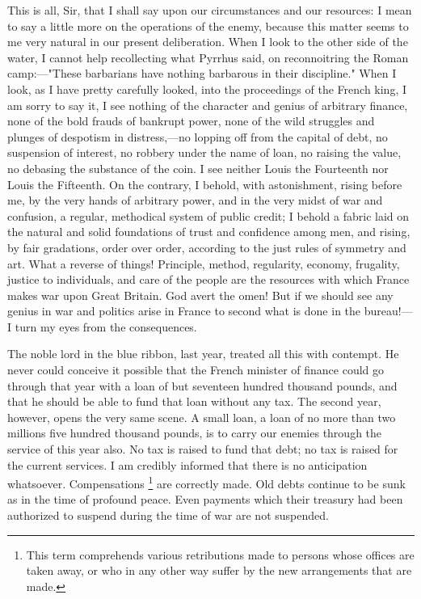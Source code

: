 This is all, Sir, that I shall say upon our circumstances and our resources: I mean to say a little more on the operations of the enemy, because this matter seems to me very natural in our present deliberation. When I look to the other side of the water, I cannot help recollecting what Pyrrhus said, on reconnoitring the Roman camp:—"These barbarians have nothing barbarous in their discipline." When I look, as I have pretty carefully looked, into the proceedings of the French king, I am sorry to say it, I see nothing of the character and genius of arbitrary finance, none of the bold frauds of bankrupt power, none of the wild struggles and plunges of despotism in distress,—no lopping off from the capital of debt, no suspension of interest, no robbery under the name of loan, no raising the value, no debasing the substance of the coin. I see neither Louis the Fourteenth nor Louis the Fifteenth. On the contrary, I behold, with astonishment, rising before me, by the very hands of arbitrary power, and in the very midst of war and confusion, a regular, methodical system of public credit; I behold a fabric laid on the natural and solid foundations of trust and confidence among men, and rising, by fair gradations, order over order, according to the just rules of symmetry and art. What a reverse of things! Principle, method, regularity, economy, frugality, justice to individuals, and care of the people are the resources with which France makes war upon Great Britain. God avert the omen! But if we should see any genius in war and politics arise in France to second what is done in the bureau!—I turn my eyes from the consequences.

The noble lord in the blue ribbon, last year, treated all this with contempt. He never could conceive it possible that the French minister of finance could go through that year with a loan of but seventeen hundred thousand pounds, and that he should be able to fund that loan without any tax. The second year, however, opens the very same scene. A small loan, a loan of no more than two millions five hundred thousand pounds, is to carry our enemies through the service of this year also. No tax is raised to fund that debt; no tax is raised for the current services. I am credibly informed that there is no anticipation whatsoever. Compensations
\footnote{This term comprehends various retributions made to persons whose offices are taken away, or who in any other way suffer by the new arrangements that are made.}
are correctly made. Old debts continue to be sunk as in the time of profound peace. Even payments which their treasury had been authorized to suspend during the time of war are not suspended.

